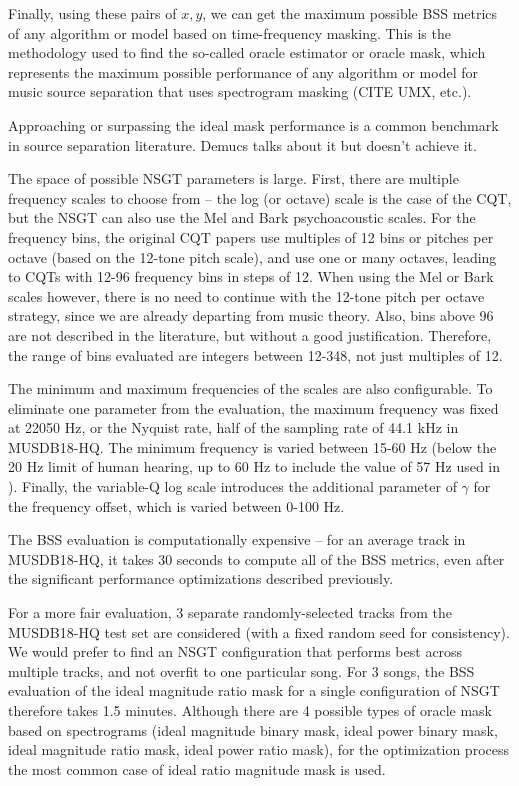 \documentclass[letter,12pt,notitlepage]{article}
\begin{document}
Finally, using these pairs of $x, y$, we can get the maximum possible BSS metrics of any algorithm or model based on time-frequency masking. This is the methodology used to find the so-called oracle estimator or oracle mask, which represents the maximum possible performance of any algorithm or model for music source separation that uses spectrogram masking (CITE UMX, etc.).

Approaching or surpassing the ideal mask performance is a common benchmark in source separation literature.  Demucs talks about it but doesn't achieve it.

The space of possible NSGT parameters is large. First, there are multiple frequency scales to choose from -- the log (or octave) scale is the case of the CQT, but the NSGT can also use the Mel and Bark psychoacoustic scales. For the frequency bins, the original CQT papers \cite{klapuricqt, invertiblecqt} use multiples of 12 bins or pitches per octave (based on the 12-tone pitch scale), and use one or many octaves, leading to CQTs with 12-96 frequency bins in steps of 12. When using the Mel or Bark scales however, there is no need to continue with the 12-tone pitch per octave strategy, since we are already departing from music theory. Also, bins above 96 are not described in the literature, but without a good justification. Therefore, the range of bins evaluated are integers between 12-348, not just multiples of 12.

The minimum and maximum frequencies of the scales are also configurable. To eliminate one parameter from the evaluation, the maximum frequency was fixed at 22050 Hz, or the Nyquist rate, half of the sampling rate of 44.1 kHz in MUSDB18-HQ. The minimum frequency is varied between 15-60 Hz (below the 20 Hz limit of human hearing, up to 60 Hz to include the value of 57 Hz used in \cite{klapuricqt}). Finally, the variable-Q log scale introduces the additional parameter of $\gamma$ for the frequency offset, which is varied between 0-100 Hz.

The BSS evaluation is computationally expensive -- for an average track in MUSDB18-HQ, it takes 30 seconds to compute all of the BSS metrics, even after the significant performance optimizations described previously.


For a more fair evaluation, 3 separate randomly-selected tracks from the MUSDB18-HQ test set are considered (with a fixed random seed for consistency). We would prefer to find an NSGT configuration that performs best across multiple tracks, and not overfit to one particular song. For 3 songs, the BSS evaluation of the ideal magnitude ratio mask for a single configuration of NSGT therefore takes 1.5 minutes. Although there are 4 possible types of oracle mask based on spectrograms (ideal magnitude binary mask, ideal power binary mask, ideal magnitude ratio mask, ideal power ratio mask), for the optimization process the most common case of ideal ratio magnitude mask is used.
\end{document}
